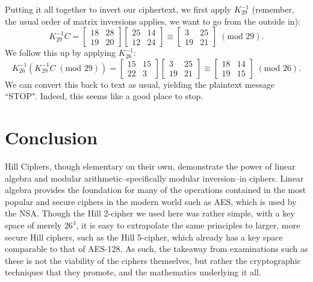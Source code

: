 \documentclass{article}
\begin{document}
Putting it all together to invert our ciphertext, we first apply $K_{29}^{-1}$ (remember, the usual order of matrix inversions applies, we want to go from the outside in):
\[
    K_{29}^{-1} C = \begin{bmatrix}
        18 & 28 \\
        19 & 20
    \end{bmatrix} \begin{bmatrix}
        25 & 14 \\
        12 & 24
    \end{bmatrix} \equiv \begin{bmatrix}
        3 & 25 \\
        19 & 21
    \end{bmatrix} \; (\text{mod } 29).
\]
We follow this up by applying $K_{26}^{-1}$:
\[
    K_{26}^{-1} (K_{29}^{-1} C \; (\text{mod } 29)) = \begin{bmatrix}
        15 & 15 \\
        22 & 3
    \end{bmatrix} \begin{bmatrix}
        3 & 25 \\
        19 & 21
    \end{bmatrix} \equiv \begin{bmatrix}
        18 & 14 \\
        19 & 15
    \end{bmatrix} \; (\text{mod } 26).
\]
We can convert this back to text as usual, yielding the plaintext message ``STOP". Indeed, this seems like a good place to stop.

\section{Conclusion}

Hill Ciphers, though elementary on their own, demonstrate the power of linear algebra and modular arithmetic--specifically modular inversion--in ciphers. Linear algebra provides the foundation for many of the operations contained in the most popular and secure ciphers in the modern world such as AES, which is used by the NSA. Though the Hill 2-cipher we used here was rather simple, with a key space of merely $26^4$, it is easy to extrapolate the same principles to larger, more secure Hill ciphers, such as the Hill 5-cipher, which already has a key space comparable to that of AES-128. As such, the takeaway from examinations such as these is not the viability of the ciphers themselves, but rather the cryptographic techniques that they promote, and the mathematics underlying it all.
\end{document}
